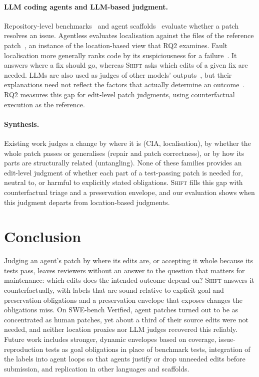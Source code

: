 \documentclass[a4paper,fleqn]{cas-sc}
\newcommand{\tool}{\textsc{Shift}}
\begin{document}
\paragraph{LLM coding agents and LLM-based judgment.} Repository-level benchmarks~\citep{jimenez2024swebench,chowdhury2024verified} and agent scaffolds~\citep{yang2024sweagent,xia2025agentless,miniswe2025} evaluate whether a patch resolves an issue. Agentless evaluates localisation against the files of the reference patch~\citep{xia2025agentless}, an instance of the location-based view that RQ2 examines. Fault localisation more generally ranks code by its suspiciousness for a failure~\citep{jones2005tarantula,wong2016fl}. It answers where a fix should go, whereas \tool{} asks which edits of a given fix are needed. LLMs are also used as judges of other models' outputs~\citep{zheng2023judge}, but their explanations need not reflect the factors that actually determine an outcome~\citep{turpin2023unfaithful}. RQ2 measures this gap for edit-level patch judgments, using counterfactual execution as the reference.

\paragraph{Synthesis.} Existing work judges a change by where it is (CIA, localisation), by whether the whole patch passes or generalises (repair and patch correctness), or by how its parts are structurally related (untangling). None of these families provides an edit-level judgment of whether each part of a test-passing patch is needed for, neutral to, or harmful to explicitly stated obligations. \tool{} fills this gap with counterfactual triage and a preservation envelope, and our evaluation shows when this judgment departs from location-based judgments.

\section{Conclusion}\label{sec:conclusion}
Judging an agent's patch by where its edits are, or accepting it whole because its tests pass, leaves reviewers without an answer to the question that matters for maintenance: which edits does the intended outcome depend on? \tool{} answers it counterfactually, with labels that are sound relative to explicit goal and preservation obligations and a preservation envelope that exposes changes the obligations miss. On SWE-bench Verified, agent patches turned out to be as concentrated as human patches, yet about a third of their source edits were not needed, and neither location proxies nor LLM judges recovered this reliably. Future work includes stronger, dynamic envelopes based on coverage, issue-reproduction tests as goal obligations in place of benchmark tests, integration of the labels into agent loops so that agents justify or drop unneeded edits before submission, and replication in other languages and scaffolds.
\end{document}
